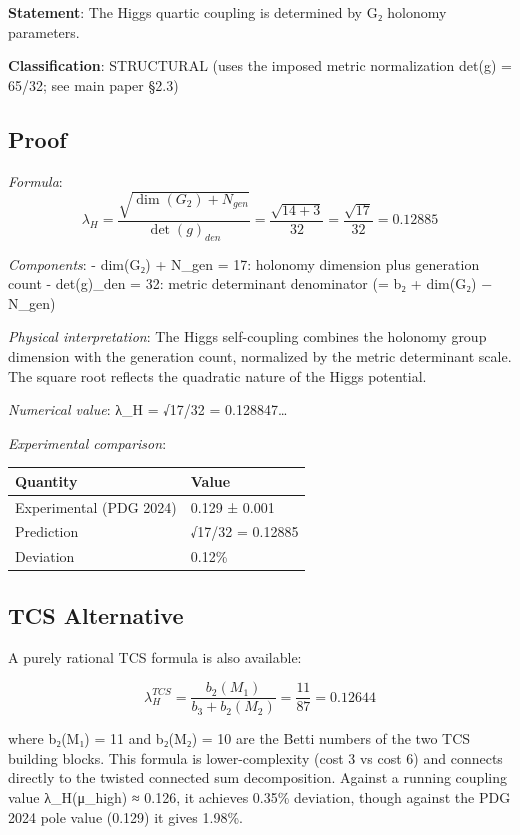 \documentclass[11pt,a4paper]{article}
\begin{document}
\textbf{Statement}: The Higgs quartic coupling is determined by G₂ holonomy parameters.

\textbf{Classification}: STRUCTURAL (uses the imposed metric normalization det(g) = 65/32; see main paper §2.3)

\subsection{Proof}\label{proof-19}

\emph{Formula}: \[\lambda_H = \frac{\sqrt{\dim(G_2) + N_{gen}}}{\det(g)_{den}} = \frac{\sqrt{14 + 3}}{32} = \frac{\sqrt{17}}{32} = 0.12885\]

\emph{Components}: - dim(G₂) + N\_\allowbreak{}gen = 17: holonomy dimension plus generation count - det(g)\_\allowbreak{}den = 32: metric determinant denominator (= b₂ + dim(G₂) − N\_\allowbreak{}gen)

\emph{Physical interpretation}: The Higgs self-coupling combines the holonomy group dimension with the generation count, normalized by the metric determinant scale. The square root reflects the quadratic nature of the Higgs potential.

\emph{Numerical value}: λ\_\allowbreak{}H = √17/32 = 0.128847\ldots{}

\emph{Experimental comparison}:

\begin{longtable}[]{@{}ll@{}}
\toprule\noalign{}
Quantity & Value \\
\midrule\noalign{}
\endhead
\bottomrule\noalign{}
\endlastfoot
Experimental (PDG 2024) & 0.129 ± 0.001 \\
Prediction & √17/32 = 0.12885 \\
Deviation & 0.12\% \\
\end{longtable}

\subsection{TCS Alternative}\label{tcs-alternative}

A purely rational TCS formula is also available:

\[\lambda_H^{TCS} = \frac{b_2(M_1)}{b_3 + b_2(M_2)} = \frac{11}{87} = 0.12644\]

where b₂(M₁) = 11 and b₂(M₂) = 10 are the Betti numbers of the two TCS building blocks. This formula is lower-complexity (cost 3 vs cost 6) and connects directly to the twisted connected sum decomposition. Against a running coupling value λ\_\allowbreak{}H(μ\_\allowbreak{}high) ≈ 0.126, it achieves 0.35\% deviation, though against the PDG 2024 pole value (0.129) it gives 1.98\%.
\end{document}
